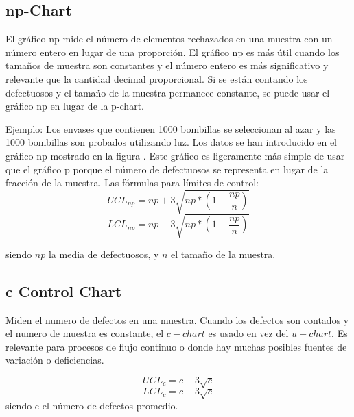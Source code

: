 \documentclass[oneside]{book}
\begin{document}
\subsection{np-Chart}
El gráfico np mide el número de elementos rechazados en una muestra con un número entero en lugar de una proporción. El gráfico np es más útil cuando los tamaños de muestra son constantes y el número entero es más significativo y relevante que la cantidad decimal proporcional.
Si se están contando los defectuosos y el tamaño de la muestra permanece constante, se puede usar el gráfico np en lugar de la p-chart.

Ejemplo: Los envases que contienen 1000 bombillas se seleccionan al azar y las 1000 bombillas son probados utilizando luz. Los datos se han introducido en el gráfico np mostrado en la figura . Este gráfico es ligeramente más simple de usar que el gráfico p porque el número de defectuosos se representa en lugar de la fracción de la muestra.
Las fórmulas para límites de control:
\begin{equation}
UCL_{np} = np + 3 \sqrt{np*(1-\frac{np}{n})}
\end{equation}
\begin{equation}
LCL_{np} = np - 3 \sqrt{np*(1-\frac{np}{n})}
\end{equation}

siendo $np$ la media de defectuosos, y $n$ el tamaño de la muestra.

\subsection{c Control Chart}

Miden el numero de defectos en una muestra. Cuando los defectos son contados y el numero de muestra es constante, el $c-chart$ es usado en vez del $u-chart$. Es relevante para procesos de flujo continuo o donde hay muchas posibles fuentes de variación o deficiencias.

\begin{equation}
UCL_c = c + 3\sqrt{c}
\end{equation}
\begin{equation}
LCL_c = c - 3\sqrt{c}
\end{equation}
siendo c el número de defectos promedio.
\end{document}
